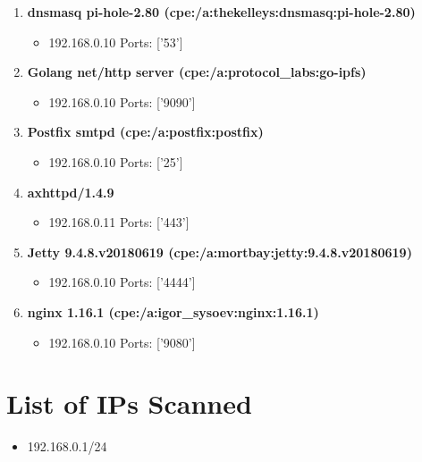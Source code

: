 \documentclass{article}
\begin{document}
\begin{enumerate}[wide, labelwidth=!, labelindent=0pt,
        label=\textbf{\large \arabic{enumi} \large}]
\begin{itemize}
\item 192.168.0.1 Ports: ['8082']
\end{itemize}
\item \textbf{\large dnsmasq pi-hole-2.80 (cpe:/a:thekelleys:dnsmasq:pi-hole-2.80)  \large}
\begin{itemize}
\item 192.168.0.10 Ports: ['53']
\end{itemize}
\item \textbf{\large Golang net/http server (cpe:/a:protocol_labs:go-ipfs)  \large}
\begin{itemize}
\item 192.168.0.10 Ports: ['9090']
\end{itemize}
\item \textbf{\large Postfix smtpd (cpe:/a:postfix:postfix)  \large}
\begin{itemize}
\item 192.168.0.10 Ports: ['25']
\end{itemize}
\item \textbf{\large axhttpd/1.4.9  \large}
\begin{itemize}
\item 192.168.0.11 Ports: ['443']
\end{itemize}
\item \textbf{\large Jetty 9.4.8.v20180619 (cpe:/a:mortbay:jetty:9.4.8.v20180619)  \large}
\begin{itemize}
\item 192.168.0.10 Ports: ['4444']
\end{itemize}
\item \textbf{\large nginx 1.16.1 (cpe:/a:igor_sysoev:nginx:1.16.1)  \large}
\begin{itemize}
\item 192.168.0.10 Ports: ['9080']
\end{itemize}
\end{enumerate}
\section*{List of IPs Scanned}\begin{itemize}
\item 192.168.0.1/24

\end{itemize}
\end{document}

